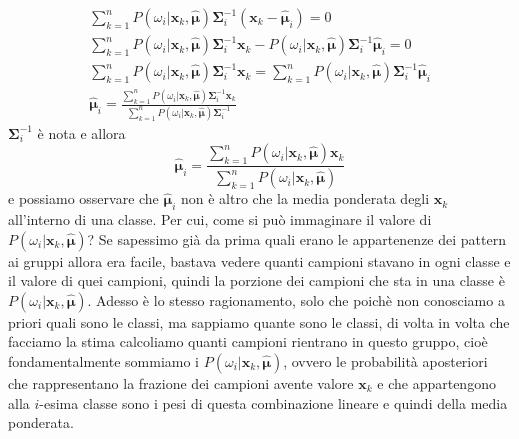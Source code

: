 \begin{gather}
\sum_{k=1}^n P(\omega_i|\mathbf{x}_k, \hat{\mathbf{\mu}}) \mathbf{\Sigma}_i^{-1}(\mathbf{x}_k - \mathbf{\hat{\mathbf{\mu}}}_i) = 0\\
\sum_{k=1}^n P(\omega_i|\mathbf{x}_k, \hat{\mathbf{\mu}}) \mathbf{\Sigma}_i^{-1} \mathbf{x}_k - P(\omega_i|\mathbf{x}_k, \hat{\mathbf{\mu}}) \mathbf{\Sigma}_i^{-1} \mathbf{\hat{\mathbf{\mu}}}_i = 0\\
\sum_{k=1}^n P(\omega_i|\mathbf{x}_k, \hat{\mathbf{\mu}}) \mathbf{\Sigma}_i^{-1} \mathbf{x}_k = \sum_{k=1}^n P(\omega_i|\mathbf{x}_k, \hat{\mathbf{\mu}}) \mathbf{\Sigma}_i^{-1} \mathbf{\hat{\mathbf{\mu}}}_i \\
\mathbf{\hat{\mathbf{\mu}}}_i = \frac{\sum_{k=1}^n P(\omega_i|\mathbf{x}_k, \hat{\mathbf{\mu}}) \mathbf{\Sigma}_i^{-1} \mathbf{x}_k}{ \sum_{k=1}^n P(\omega_i|\mathbf{x}_k, \hat{\mathbf{\mu}}) \mathbf{\Sigma}_i^{-1}}
\end{gather}
$ \mathbf{\Sigma}_i^{-1}$ è nota e allora 
\begin{equation}
\mathbf{\hat{\mathbf{\mu}}}_i = \frac{\sum_{k=1}^n P(\omega_i|\mathbf{x}_k, \hat{\mathbf{\mu}})  \mathbf{x}_k}{ \sum_{k=1}^n P(\omega_i|\mathbf{x}_k, \hat{\mathbf{\mu}})}
\end{equation}
e possiamo osservare che $\mathbf{\hat{\mathbf{\mu}}}_i$ non è altro che la media ponderata degli $\mathbf{x}_k$ all'interno di una classe. Per cui,  come si può immaginare il valore di $P(\omega_i|\mathbf{x}_k, \hat{\mathbf{\mu}})$? Se sapessimo già da prima quali erano le appartenenze dei pattern ai gruppi allora era facile, bastava vedere quanti campioni stavano in ogni classe e il valore di quei campioni, quindi la porzione dei campioni che sta in una classe è $P(\omega_i|\mathbf{x}_k, \hat{\mathbf{\mu}})$. Adesso è lo stesso ragionamento, solo che poichè non conosciamo a priori quali sono le classi, ma sappiamo quante sono le classi, di volta in volta che facciamo la stima calcoliamo quanti campioni rientrano in questo gruppo, cioè fondamentalmente sommiamo i $P(\omega_i|\mathbf{x}_k, \hat{\mathbf{\mu}})$, ovvero le probabilità aposteriori che rappresentano la frazione dei campioni avente valore $\mathbf{x}_k$ e che appartengono alla $i$-esima classe sono i pesi di questa combinazione lineare e quindi della media ponderata.\\


